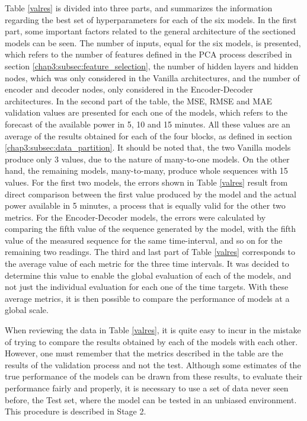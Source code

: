 Table \ref{valres} is divided into three parts, and summarizes the information regarding the best set of hyperparameters for each of the six models. In the first part, some important factors related to the general architecture of the sectioned models can be seen. The number of inputs, equal for the six models, is presented, which refers to the number of features defined in the \ac{PCA} process described in section \ref{chap3:subsec:feature_selection}, the number of hidden layers and hidden nodes, which was only considered in the Vanilla architectures, and the number of encoder and decoder nodes, only considered in the Encoder-Decoder architectures. In the second part of the table, the \ac{MSE}, \ac{RMSE} and \ac{MAE} validation values are presented for each one of the models, which refers to the forecast of the available power in 5, 10 and 15 minutes. All these values are an average of the results obtained for each of the four blocks, as defined in section \ref{chap3:subsec:data_partition}. It should be noted that, the two Vanilla models produce only 3 values, due to the nature of many-to-one models. On the other hand, the remaining models, many-to-many, produce whole sequences with 15 values. For the first two models, the errors shown in Table \ref{valres}  result from direct comparison between the first value produced by the model and the actual power available in 5 minutes, a process that is equally valid for the other two metrics. For the Encoder-Decoder models, the errors were calculated by comparing the fifth value of the sequence generated by the model, with the fifth value of the measured sequence for the same time-interval, and so on for the remaining two readings. The third and last part of Table \ref{valres} corresponds to the average value of each metric for the three time intervals. It was decided to determine this value to enable the global evaluation of each of the models, and not just the individual evaluation for each one of the time targets. With these average metrics, it is then possible to compare the performance of models at a global scale.


When reviewing the data in Table \ref{valres}, it is quite easy to incur in the mistake of trying to compare the results obtained by each of the models with each other. However, one must remember that the metrics described in the table are the results of the validation process and not the test. Although some estimates of the true performance of the models can be drawn from these results, to evaluate their performance fairly and properly, it is necessary to use a set of data never seen before, the Test set, where the model can be tested in an unbiased environment. This procedure is described in Stage 2.


